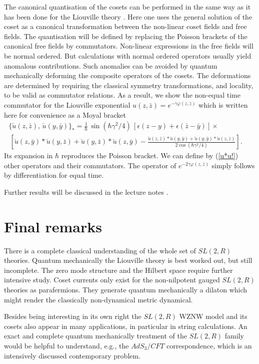 \documentclass[a4paper,12]{article}
\begin{document}
The canonical quantisation of the cosets can be performed in the same
way as it has been done for the Liouville theory \cite{OW}. Here one
uses the general solution of the coset as a canonical transformation
between the non-linear coset fields and free fields. The quantisation
will be defined by replacing the Poisson brackets of the canonical
free fields by commutators. Non-linear expressions in the free fields
will be normal ordered. But calculations with normal ordered operators
usually yield anomalous contributions. Such anomalies can be avoided
by quantum mechanically deforming the composite operators of the
cosets. The deformations are determined by requiring the classical
symmetry transformations, and locality, to be valid as commutator
relations. As a result, we show the non-equal time commutator for the
Liouville exponential $u(z, \bar z)=e^{-\gamma\varphi(z, \bar z)}$
which is written here for convenience as a Moyal bracket \cite{JW}
\begin{eqnarray}\label{u*u!}
\{\check u(z,\bar z),\,\check u(y,\bar y)\}_*=
\frac{1}{\hbar}\,\sin(\hbar\gamma^2/4)\,
[\epsilon(z-y)+\epsilon(\bar z-\bar y)]\times
~~~~~~~~~~~~~~~~~~~~~
\\ \nonumber
\,\left[\check u(z, \bar y) * \check u(y, \bar z) +\check u(y, \bar z)*
\check u(z, \bar y)-
\frac{\check u(z, \bar z)* \check u(y, \bar y)+\check u(y, \bar y)*
\check u(z, \bar z)}{2\cos(\hbar\gamma^2/4)}
\right].
\end{eqnarray}
Its expansion in $\hbar$ reproduces the 
Poisson bracket. We can define by (\ref{u*u!}) other operators and 
their commutators. 
The operator of $e^{-2\gamma\varphi(z,\bar z)}$ simply follows
by differentiation for equal time.

Further results will be discussed in the lecture notes \cite{JW2}.

\section{Final remarks}

There is a complete classical understanding of the whole set of
$SL(2,R)$ theories. Quantum mechanically the Liouville theory is best
worked out, but still incomplete. The zero mode structure and the
Hilbert space require further intensive study. Coset currents only exist for
the non-nilpotent gauged $SL(2,R)$ theories as parafermions. They generate
quantum mechanically a dilaton which might render the classically
non-dynamical metric dynamical.

Besides being interesting in its own right the $SL(2,R)$ WZNW model
and its cosets also appear in many applications, in particular in
string calculations. An exact and complete quantum mechanically
treatment of the $SL(2,R)$ family would be helpful to understand,
e.g., the $AdS_3/CFT$ correspondence, which is an intensively
discussed  contemporary problem.
\end{document}
